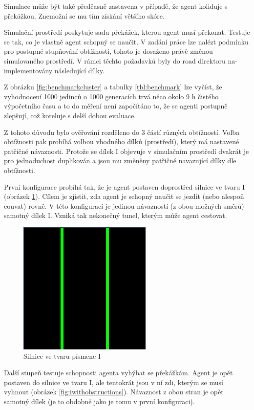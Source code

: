 Simulace může být také předčasně zastavena v případě, že agent koliduje s překážkou. Znemožní se mu tím získání většího skóre.

\label{sec:simulationEnvironment}
Simulační prostředí poskytuje sadu překážek, kterou agent musí překonat. Testuje se tak, co je vlastně agent schopný se naučit. V zadání práce lze nalézt podmínku pro postupné stupňování obtížnosti, tohoto je dosaženo právě změnou simulovaného prostředí. V rámci těchto požadavků byly do road direktoru na-implementovány následující dílky.

Z obrázku \ref{fig:benchmarkcluster} a tabulky \ref{tbl:benchmark} lze vyčíst, že vyhodnocení 1000 jedinců o 1000 generacích trvá něco okolo 9 h čistého výpočetního času a to do měření není započítáno to, že se agenti postupně zlepšují, což koreluje s delší dobou evaluace. 

Z tohoto důvodu bylo ověřování rozděleno do 3 částí různých obtížností. Volba obtížnosti pak probíhá volbou vhodného dílků (prostředí), který má nastavené patřičné návaznosti. Protože se dílek I objevuje v simulačním prostředí dvakrát je pro jednoduchost duplikován a jsou mu změněny patřičné navazující dílky dle obtížnosti.

První konfigurace probíhá tak, že je agent postaven doprostřed silnice ve tvaru I (obrázek \ref{fig:i}). Cílem je zjistit, zda agent je schopný naučit se jezdit (nebo alespoň couvat) rovně. V této konfiguraci je jedinou návazností (z obou možných směrů) samotný dílek I. Vzniká tak nekonečný tunel, kterým může agent cestovat.

\begin{figure}[H]
	\centering
	\includegraphics[scale=0.5]{pieces/I}
	\caption{Silnice ve tvaru písmene I}
	\label{fig:i}
\end{figure}
  
Další stupeň testuje schopnosti agenta vyhýbat se překážkám. Agent je opět postaven do silnice ve tvaru I, ale tentokrát jsou v ní zdi, kterým se musí vyhnout (obrázek \ref{fig:iwithobstructions}). Návaznost z obou stran je opět samotný dílek (je to obdobně jako je tomu v první konfiguraci).

